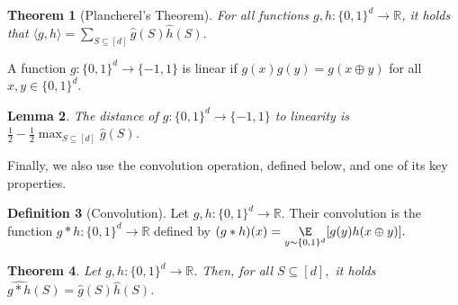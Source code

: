 \documentclass[11pt]{article}
\numberwithin{equation}{section}
\newtheorem{theorem}{Theorem}[section]
\newtheorem{lemma}[theorem]{Lemma}
\theoremstyle{definition}
\newtheorem{definition}[theorem]{Definition}
\theoremstyle{plain}
\newcommand{\R}{\mathbb R}
\begin{document}
\begin{theorem}[Plancherel's Theorem] \label{thm:plancherel}
For all functions $g, h \colon\{0,1\}^d \to \R$, it holds that $ \langle g, h\rangle = \sum_{S\subseteq [d]}  \widehat{g}(S)\widehat{h}(S).$
\end{theorem}

A function $g\colon\{0,1\}^d \to \{-1,1\}$ is linear if $g(x)g(y) = g(x\oplus y)$ for all $x, y \in \{0,1\}^d$. 

\begin{lemma}\label{lem:dist_to_linearity}
The distance of $g\colon\{0,1\}^d \to \{-1,1\}$ to linearity is $\frac{1}{2} - \frac{1}{2}\max_{S\subseteq [d]}\widehat{g}(S)$. 
\end{lemma}

Finally, we also use the convolution operation, defined below, and one of its key properties. 
 
\begin{definition}[Convolution]
Let $g, h \colon\{0,1\}^d \to \R$. Their convolution is the function $g *h: \{0,1\}^d \to \R$ defined by
$
    (g * h)(x) = \underset{y\sim \{0,1\}^d}{\E}[g(y)h(x\oplus y)].
$
\end{definition}

\begin{theorem} \label{thm:convolution}
Let $g, h \colon\{0,1\}^d \to \R$. Then, for all $S \subseteq [d],$ it holds $\widehat{g * h}(S) = \widehat{g}(S)\widehat{h}(S)$. 
\end{theorem}
\end{document}
